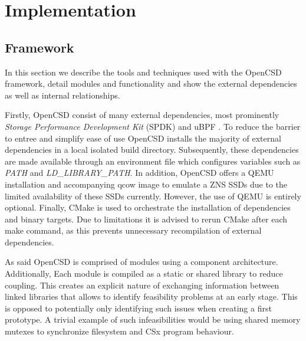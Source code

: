 
\chapter{Implementation} %



\ifpdf
    \graphicspath{{7/figures/PNG/}{7/figures/PDF/}{7/figures/}}
\else
    \graphicspath{{7/figures/EPS/}{7/figures/}}
\fi

\section{Framework}

In this section we describe the tools and techniques used with the OpenCSD
framework, detail modules and functionality and show the external dependencies
as well as internal relationships.

Firstly, OpenCSD consist of many external dependencies, most prominently
\textit{Storage Performance Development Kit} (SPDK) \cite{spdk} and uBPF
\cite{ubpf}. To reduce the barrier to entree and simplify ease of use OpenCSD
installs the majority of external dependencies in a local isolated build
directory. Subsequently, these dependencies are made available through an
environment file which configures variables such as \textit{PATH} and
\textit{LD\_LIBRARY\_PATH}. In addition, OpenCSD offers a QEMU installation and
accompanying qcow image to emulate a ZNS SSDs due to the limited availability of
these SSDs currently. However, the use of QEMU is entirely optional. Finally,
CMake \cite{cmake} is used to orchestrate the installation of dependencies and
binary targets. Due to limitations it is advised to rerun CMake after each make
command, as this prevents unnecessary recompilation of external
dependencies\footnotemark[9].


As said OpenCSD is comprised of modules using a component architecture.
Additionally, Each module is compiled as a static or shared library to reduce
coupling. This creates an explicit nature of exchanging information between
linked libraries that allows to identify feasibility problems at an early stage.
This is opposed to potentially only identifying such issues when creating a
first prototype. A trivial example of such infeasibilities would be using shared
memory mutexes to synchronize filesystem and CSx program behaviour.

